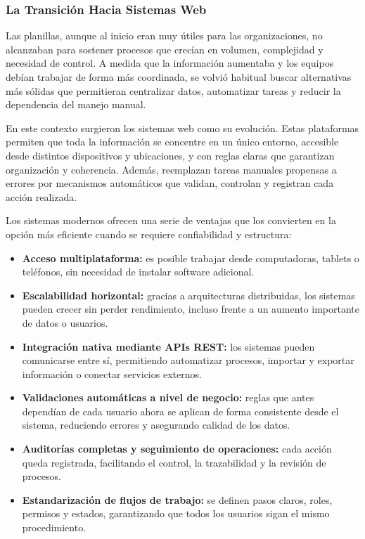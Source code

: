 \subsubsection{La Transición Hacia Sistemas Web}

Las planillas, aunque al inicio eran muy útiles para las organizaciones, no alcanzaban para sostener procesos que crecían en volumen, complejidad y necesidad de control. A medida que la información aumentaba y los equipos debían trabajar de forma más coordinada, se volvió habitual buscar alternativas más sólidas que permitieran centralizar datos, automatizar tareas y reducir la dependencia del manejo manual.

En este contexto surgieron los sistemas web como su evolución. Estas plataformas permiten que toda la información se concentre en un único entorno, accesible desde distintos dispositivos y ubicaciones, y con reglas claras que garantizan organización y coherencia. Además, reemplazan tareas manuales propensas a errores por mecanismos automáticos que validan, controlan y registran cada acción realizada.

Los sistemas modernos ofrecen una serie de ventajas que los convierten en la opción más eficiente cuando se requiere confiabilidad y estructura:

\begin{itemize}
    \item \textbf{Acceso multiplataforma:} es posible trabajar desde computadoras, tablets o teléfonos, sin necesidad de instalar software adicional.
    
    \item \textbf{Escalabilidad horizontal:} gracias a arquitecturas distribuidas, los sistemas pueden crecer sin perder rendimiento, incluso frente a un aumento importante de datos o usuarios.
    
    \item \textbf{Integración nativa mediante APIs REST:} los sistemas pueden comunicarse entre sí, permitiendo automatizar procesos, importar y exportar información o conectar servicios externos.
    
    \item \textbf{Validaciones automáticas a nivel de negocio:} reglas que antes dependían de cada usuario ahora se aplican de forma consistente desde el sistema, reduciendo errores y asegurando calidad de los datos.
    
    \item \textbf{Auditorías completas y seguimiento de operaciones:} cada acción queda registrada, facilitando el control, la trazabilidad y la revisión de procesos.
    
    \item \textbf{Estandarización de flujos de trabajo:} se definen pasos claros, roles, permisos y estados, garantizando que todos los usuarios sigan el mismo procedimiento.
\end{itemize}

